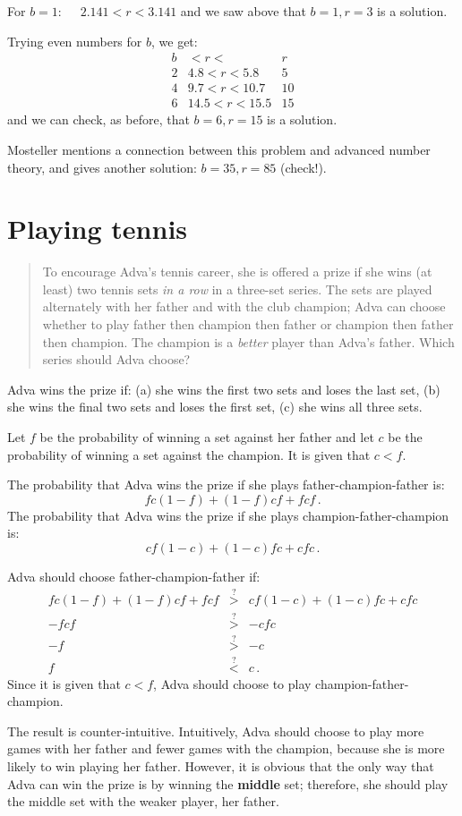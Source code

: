 \documentclass[11pt,a4paper]{article}
\begin{document}
For $b=1\!:\quad$ $2.141 < r< 3.141$ and we saw above that $b=1,r=3$ is a solution.

\bigskip

Trying even numbers for $b$, we get:
\begin{displaymath}	
\renewcommand{\arraystretch}{1}
\begin{array}{r|c|c}
b& <r< &r\\
\hline
2&4.8<r<5.8&5\\
4&9.7<r<10.7&10\\
6&14.5<r<15.5&15
\end{array}
\end{displaymath}
and we can check, as before, that $b=6,r=15$ is a solution.

Mosteller mentions a connection between this problem and advanced number theory, and gives another solution: $b=35,r=85$ (check!).

\newpage

\section{Playing tennis}

\begin{quote}
To encourage Adva's tennis career, she is offered a prize if she wins (at least) two tennis sets \emph{in a row} in a three-set series. The sets are played alternately with her father and with the club champion; Adva can choose whether to play father then champion then father or champion then father then champion. The champion is a \emph{better} player than Adva's father. Which series should Adva choose?
\end{quote}

Adva wins the prize if: (a) she wins the first two sets and loses the last set, (b) she wins the final two sets and loses the first set, (c) she wins all three sets.

Let $f$ be the probability of winning a set against her father and let $c$ be the probability of winning a set against the champion. It is given that $c<f$.

The probability that Adva wins the prize if she plays father-champion-father is:
\[
fc(1-f) + (1-f)cf + fcf\,.
\]
The probability that Adva wins the prize if she plays champion-father-champion is:
\[
cf(1-c)+(1-c)fc+cfc\,.
\]

Adva should choose father-champion-father if:
\begin{eqnarray*}
fc(1-f) + (1-f)cf + fcf & \stackrel{?}{>}& cf(1-c)+(1-c)fc+cfc\\
-fcf & \stackrel{?}{>}& -cfc\\
-f & \stackrel{?}{>}& -c\\
f & \stackrel{?}{<}& c\,.
\end{eqnarray*}
Since it is given that $c<f$, Adva should choose to play champion-father-champion.

The result is counter-intuitive. Intuitively, Adva should choose to play more games with her father and fewer games with the champion, because she is more likely to win playing her father. However, it is obvious that the only way that Adva can win the prize is by winning the \textbf{middle} set; therefore, she should play the middle set with the weaker player, her father.
\end{document}

